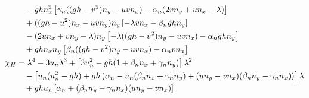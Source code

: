 \documentclass[11pt, a4paper, oneside]{report}
\begin{document}
\begin{appendices}
\begin{align}
    & \quad - gh n_x^2 \left[ \gamma_n ((gh - v^2) n_y - uv n_x) - \alpha_n (2v n_y + u n_x - \lambda) \right] \notag \\
    & \quad + ((gh - u^2) n_x - uv n_y) n_y \left[ -\lambda v n_x - \beta_n gh n_y \right] \notag \\
    & \quad - (2u n_x + v n_y - \lambda) n_y \left[ -\lambda((gh - v^2) n_y - uv n_x) - \alpha_n gh n_y \right] \notag \\
    & \quad + gh n_x n_y \left[ \beta_n ((gh - v^2) n_y - uv n_x) - \alpha_n v n_x \right] \notag \\
    \chi_H & = \lambda^4 - 3u_n \lambda^3 + \left[ 3 u_n^2 -gh(1 + \beta_n n_x + \gamma_n n_y) \right] \lambda^2 \notag \\
    & \quad - \left[ u_n(u_n^2 - gh) + gh \left( \alpha_n - u_n(\beta_n n_x + \gamma_n n_y) + (u n_y - v n_x)(\beta_n n_y - \gamma_n n_x) \right) \right] \lambda \notag \\
    & \quad + gh u_n \left[ \alpha_n + (\beta_n n_y - \gamma_n n_x)(u n_y - v n_x) \right] \label{eq:polynome_exner}
\end{align}


\end{appendices}
\end{document}
